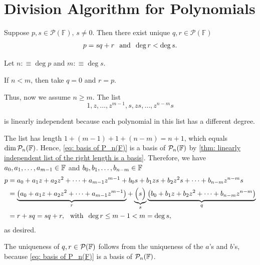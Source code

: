 \section{Division Algorithm for Polynomials}

\setcounter{thm}{8}
\begin{thm}
  \label{division-algorithm-for-polynomials}
  Suppose $p,s \in \mathcal{P} (\mathbb{F}), \, s\neq 0$.
  Then there exist unique $q,r \in \mathcal{P} (\mathbb{F})$ \st
  \begin{equation}
    p=sq+r \;\;\, \text{and}\;\; \deg r < \deg s.
  \end{equation}
\end{thm}
\begin{prf}
  Let $n:\equiv \deg p$ and $m:\equiv \deg s$.

  If $n<m$, then take $q=0$ and $r=p$.

  Thus, now we assume $n \geq m$. The list
  \begin{equation}
    \label{eq: basis of P_n(F)}
    1, z, \ldots, z^{m-1}, s, zs, \ldots, z^{n-m}s
  \end{equation}

  is linearly independent because each polynomial in this list has a different degree.

  The list has length $1+(m-1)+1+(n-m)=n+1$, which equals $\dim \mathcal{P}_n(\mathbb{F})$. Hence, \eqref{eq: basis of P_n(F)} is a basis of $\mathcal{P}_n(\mathbb{F})$ by \ref{thm: linearly independent list of the right length is a basis}. Therefore, we have $a_0, a_1, \ldots, a_{m-1} \in \mathbb{F}$ and $b_0, b_1, \ldots, b_{n-m} \in \mathbb{F}$ \st
  \begin{equation}
    \begin{aligned}
          p&=a_0 + a_1z + a_2z^2 + \cdots + a_{m-1} z^{m-1}
          + b_0 s + b_1 zs + b_2 z^2 s + \cdots + b_{n-m}z^{n-m}s \\
           &=\underbrace{\left(a_0 + a_1z + a_2z^2 + \cdots + a_{m-1} z^{m-1} \right)}_{r} + \underbrace{\Big(s\Big)}_{s} \underbrace{\left( b_0 + b_1 z + b_2 z^2 + \cdots + b_{n-m} z^{n-m} \right)}_{q} \\
           &=r+sq=sq+r, \;\;\, \text{with}\;\; \deg r \leq m-1 < m = \deg s,
    \end{aligned}
  \end{equation}
  as desired.

  The uniqueness of $q,r \in \mathcal{P}(\mathbb{F})$ follows from the uniqueness of the $a$'s and $b$'s, because \eqref{eq: basis of P_n(F)} is a basis of $\mathcal{P}_n(\mathbb{F})$.
\end{prf}
